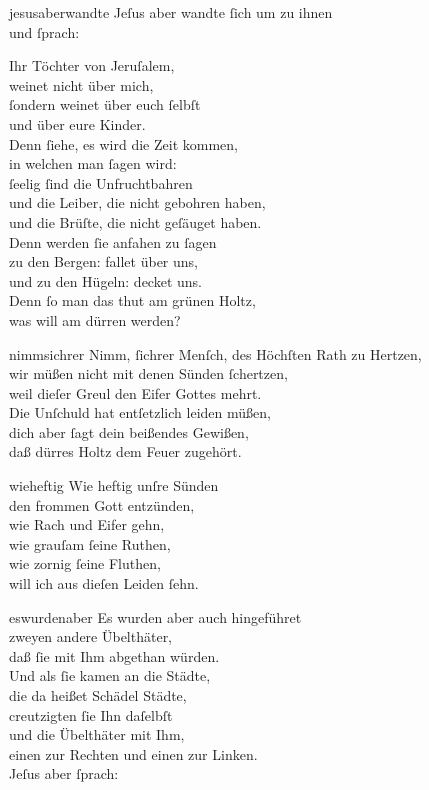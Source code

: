 \documentclass[tocstyle=ref-genre]{ees}
\begin{document}
{\begin{movement}{jesusaberwandte}
  \voice[Evangelist]
  Jeſus aber wandte ſich um zu ihnen\\
  und ſprach:

  \voice[Jesus]
  Ihr Töchter von Jeruſalem,\\
  weinet nicht über mich,\\
  ſondern weinet über euch ſelbſt\\
  und über eure Kinder.\\
  Denn ſiehe, es wird die Zeit kommen,\\
  in welchen man ſagen wird:\\
  ſeelig ſind die Unfruchtbahren\\
  und die Leiber, die nicht gebohren haben,\\
  und die Brüſte, die nicht geſäuget haben.\\
  Denn werden ſie anfahen zu ſagen\\
  zu den Bergen: fallet über uns,\\
  und zu den Hügeln: decket uns.\\
  Denn ſo man das thut am grünen Holtz,\\
  was will am dürren werden?
\end{movement}

\begin{movement}{nimmsichrer}
  \voice[Basso]
  Nimm, ſichrer Menſch, des Höchſten Rath zu Hertzen,\\
  wir müßen nicht mit denen Sünden ſchertzen,\\
  weil dieſer Greul den Eifer Gottes mehrt.\\
  Die Unſchuld hat entſetzlich leiden müßen,\\
  dich aber ſagt dein beißendes Gewißen,\\
  daß dürres Holtz dem Feuer zugehört.
\end{movement}

\clearpage
\begin{movement}{wieheftig}
  \voice[Chor]
  Wie heftig unſre Sünden\\
  den frommen Gott entzünden,\\
  wie Rach und Eifer gehn,\\
  wie grauſam ſeine Ruthen,\\
  wie zornig ſeine Fluthen,\\
  will ich aus dieſen Leiden ſehn.
\end{movement}

\begin{movement}{eswurdenaber}
  \voice[Evangelist]
  Es wurden aber auch hingeführet\\
  zweyen andere Übelthäter,\\
  daß ſie mit Ihm abgethan würden.\\
  Und als ſie kamen an die Städte,\\
  die da heißet Schädel Städte,\\
  creutzigten ſie Ihn daſelbſt\\
  und die Übelthäter mit Ihm,\\
  einen zur Rechten und einen zur Linken.\\
  Jeſus aber ſprach:


\end{movement}}
\end{document}
